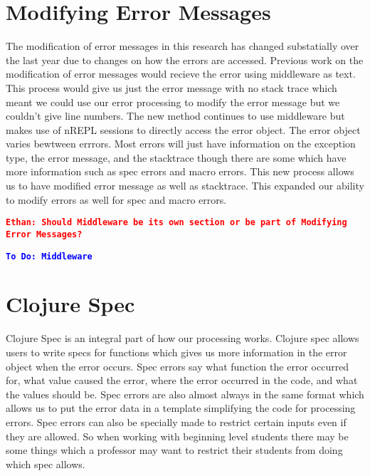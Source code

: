 \documentclass[12pt]{article}
\newcommand{\comment}[1]{{\bf \tt  {#1}}}
\newcommand{\eucomment}[1]{\textcolor{red}{\comment{Ethan: {#1}}}}
\newcommand{\todo}[1]{\textcolor{blue}{\comment{To Do: {#1}}}}
\begin{document}
\section{Modifying Error Messages}
The modification of error messages in this research has changed substatially over the last year due to changes on how the errors are accessed. 
Previous work on the modification of error messages would recieve the error using middleware as text.
This process would give us just the error message with no stack trace which meant we could use our error processing to modify the error message but we couldn't give line numbers.
The new method continues to use middleware but makes use of nREPL sessions to directly access the error object.
The error object varies bewtween errrors. 
Most errors will just have information on the exception type, the error message, and the stacktrace though there are some which have more information such as spec errors and macro errors.
This new process allows us to have modified error message as well as stacktrace.
This expanded our ability to modify errors as well for spec and macro errors.

\eucomment{Should Middleware be its own section or be part of Modifying Error Messages?}

\todo{Middleware}


\section{Clojure Spec}
Clojure Spec is an integral part of how our processing works. 
Clojure spec allows users to write specs for functions which gives us more information in the error object when the error occurs. 
Spec errors say what function the error occurred for, what value caused the error, where the error occurred in the code, and what the values should be. 
Spec errors are also almost always in the same format which allows us to put the error data in a template simplifying the code for processing errors. 
Spec errors can also be specially made to restrict certain inputs even if they are allowed. 
So when working with beginning level students there may be some things which a professor may want to restrict their students from doing which spec allows.
\end{document}
